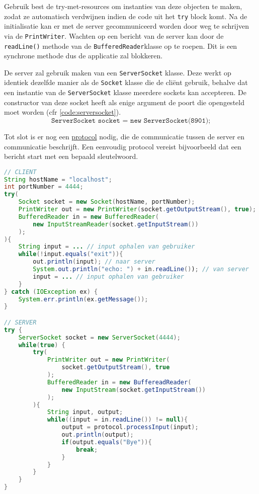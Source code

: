 \documentclass{report}
\begin{document}
 
 Gebruik best de try-met-resources om instanties van deze objecten te maken, zodat ze automatisch verdwijnen indien de code uit het \texttt{try} block komt. Na de initialisatie kan er met de server gecommuniceerd worden door weg te schrijven via de \texttt{PrintWriter}. Wachten op een bericht van de server kan door de \texttt{readLine()} methode van de \texttt{BufferedReader}klasse op te roepen. Dit is een synchrone methode dus de applicatie zal blokkeren. 

De server zal gebruik maken van een \texttt{ServerSocket} klasse. Deze werkt op identiek dezelfde manier als de \texttt{Socket} klasse die de cliënt gebruik, behalve dat een instantie van de \texttt{ServerSocket} klasse meerdere sockets kan accepteren. De constructor van deze socket heeft als enige argument de poort die opengesteld moet worden (cfr \ref{code:serversocket}).
\begin{equation}
	\texttt{ServerSocket socket = new ServerSocket(8901);}
	\label{code:serversocket}
\end{equation}

Tot slot is er nog een \underline{protocol} nodig, die de communicatie tussen de server en communicatie beschrijft. Een eenvoudig protocol vereist bijvoorbeeld dat een bericht start met een bepaald sleutelwoord. 

\begin{lstlisting}[language=java]
// CLIENT
String hostName = "localhost";
int portNumber = 4444;
try(
    Socket socket = new Socket(hostName, portNumber);
    PrintWriter out = new PrintWriter(socket.getOutputStream(), true);
    BufferedReader in = new BufferedReader(
        new InputStreamReader(socket.getInputStream())
    );
){
    String input = ... // input ophalen van gebruiker
    while(!input.equals("exit")){
        out.println(input); // naar server
        System.out.println("echo: ") + in.readLine()); // van server
        input = ... // input ophalen van gebruiker
    }
} catch (IOException ex) {
    System.err.println(ex.getMessage());
}

// SERVER
try {
    ServerSocket socket = new ServerSocket(4444);
    while(true) {
        try(
            PrintWriter out = new PrintWriter(
                socket.getOutputStream(), true
            );
            BufferedReader in = new BuffereadReader(
                new InputStream(socket.getInputStream())
            );
        ){
            String input, output;
            while((input = in.readLine()) != null){
                output = protocol.processInput(input);
                out.println(output);
                if(output.equals("Bye")){
                    break;
                }
            }
        }
    }
}
\end{lstlisting}
\end{document}
